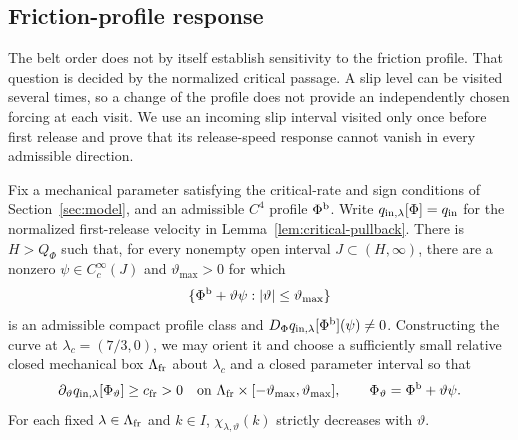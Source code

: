 \subsection{Friction-profile response}
\label{sec:profile-response}

The belt order does not by itself establish sensitivity to the friction
profile. That question is decided by the normalized critical passage.
A slip level can be visited several times, so a change of the profile
does not provide an independently chosen forcing at each visit.
We use an incoming slip interval visited only once before first release
and prove that its release-speed response cannot vanish in every
admissible direction.

\begin{proposition}
\label{sel:profile-response}
Fix a mechanical parameter satisfying the critical-rate and sign
conditions of Section~\ref{sec:model}, and an admissible $C^4$
profile $\Phi^{\rm b}$. Write $q_{\rm in,\lambda}[\Phi]=q_{\rm in}$ for the
normalized first-release velocity in Lemma~\ref{lem:critical-pullback}.
There is $H>Q_\Phi$
such that, for every nonempty open interval $J\subset(H,\infty)$,
there are a nonzero $\psi\in C_c^\infty(J)$ and
$\vartheta_{\max}>0$ for which
\[
 \{\Phi^{\rm b}+\vartheta\psi:
                        |\vartheta|\le\vartheta_{\max}\}
\]
is an admissible compact profile class and
$D_\Phi q_{\rm in,\lambda}[\Phi^{\rm b}](\psi)\ne0$.
Constructing the curve at $\lambda_c=(7/3,0)$, we may orient it
and choose a sufficiently small relative closed mechanical box
$\Lambda_{\rm fr}$ about $\lambda_c$ and a closed parameter interval so that
\begin{equation}
 \partial_\vartheta q_{\rm in,\lambda}[\Phi_\vartheta]\ge c_{\rm fr}>0
 \quad\text{on }\Lambda_{\rm fr}\times
                   [-\vartheta_{\max},\vartheta_{\max}],
 \qquad \Phi_\vartheta=\Phi^{\rm b}+\vartheta\psi.
 \label{sel:profile-local-order}
\end{equation}
For each fixed $\lambda\in\Lambda_{\rm fr}$ and $k\in I$,
$\chi_{\lambda,\vartheta}(k)$ strictly decreases with $\vartheta$.
\end{proposition}
